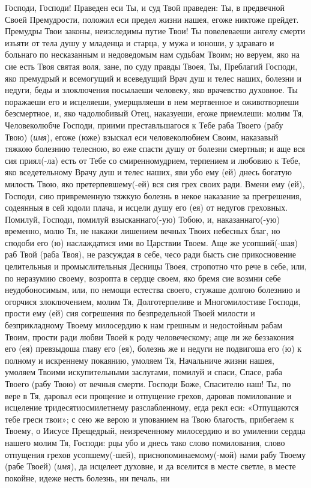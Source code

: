 \mychapterending


\begin{mymulticols}
 


Господи, Господи! Праведен еси Ты, и суд Твой праведен: Ты, в предвечной Своей Премудрости, положил еси предел жизни нашея, егоже никтоже прейдет. Премудры Твои законы, неизследимы путие Твои! Ты повелеваеши ангелу смерти изъяти от тела душу у младенца и старца, у мужа и юноши, у здраваго и больнаго по несказанным и недоведомым нам судьбам Твоим; но веруем, яко на сие есть Твоя святая воля, зане, по суду правды Твоея, Ты, Преблагий Господи, яко премудрый и всемогущий и всеведущий Врач душ и телес наших, болезни и недуги, беды и злоключения посылаеши человеку, яко врачевство духовное. Ты поражаеши его и исцеляеши, умерщвляеши в нем мертвенное и оживотворяеши безсмертное, и, яко чадолюбивый Отец, наказуеши, егоже приемлеши: молим Тя, Человеколюбче Господи, приими преставльшагося к Тебе раба Твоего (рабу Твою) ({\itshape имя}), егоже (юже) взыскал еси человеколюбием Своим, наказавый тяжкою болезнию телесною, во еже спасти душу от болезни смертныя; и аще вся сия приял(-ла) есть от Тебе со смиренномудрием, терпением и любовию к Тебе, яко вседетельному Врачу душ и телес наших, яви убо ему (ей) днесь богатую милость Твою, яко претерпевшему(-ей) вся сия грех своих ради. Вмени ему (ей), Господи, сию привременную тяжкую болезнь в некое наказание за прегрешения, содеянныя в сей юдоли плача, и исцели душу его (ея) от недугов греховных. Помилуй, Господи, помилуй взысканнаго(-ую) Тобою, и, наказаннаго(-ую) временно, молю Тя, не накажи лишением вечных Твоих небесных благ, но сподоби его (ю) наслаждатися ими во Царствии Твоем. Аще же усопший(-шая) раб Твой (раба Твоя), не разсуждая в себе, чесо ради бысть сие прикосновение целительныя и промыслительныя Десницы Твоея, стропотно что рече в себе, или, по неразумию своему, возропта в сердце своем, яко бремя сие возмни себе неудобоносимым, или, по немощи естества своего, стужаше долгою болезнию и огорчися злоключением, молим Тя, Долготерпеливе и Многомилостиве Господи, прости ему (ей) сия согрешения по безпредельной Твоей милости и безприкладному Твоему милосердию к нам грешным и недостойным рабам Твоим, прости ради любви Твоей к роду человеческому; аще ли же беззакония его (ея) превзыдоша главу его (ея), болезнь же и недуги не подвигоша его (ю) к полному и искреннему покаянию, умоляем Тя, Начальниче жизни нашея, умоляем Твоими искупительными заслугами, помилуй и спаси, Спасе, раба Твоего (рабу Твою) от вечныя смерти. Господи Боже, Спасителю наш! Ты, по вере в Тя, даровал еси прощение и отпущение грехов, даровав помилование и исцеление тридесятиосмилетнему разслабленному, егда рекл еси: «Отпущаются тебе греси твои»; с сею же верою и упованием на Твою благость, прибегаем к Твоему, о Иисусе Прещедрый, неизреченному милосердию и во умилении сердца нашего молим Тя, Господи: рцы убо и днесь тако слово помилования, слово отпущения грехов усопшему(-шей), приснопоминаемому(-мой) нами рабу Твоему (рабе Твоей) ({\itshape имя}), да исцелеет духовне, и да вселится в месте светле, в месте покойне, идеже несть болезнь, ни печаль, ни 
\end{mymulticols}
